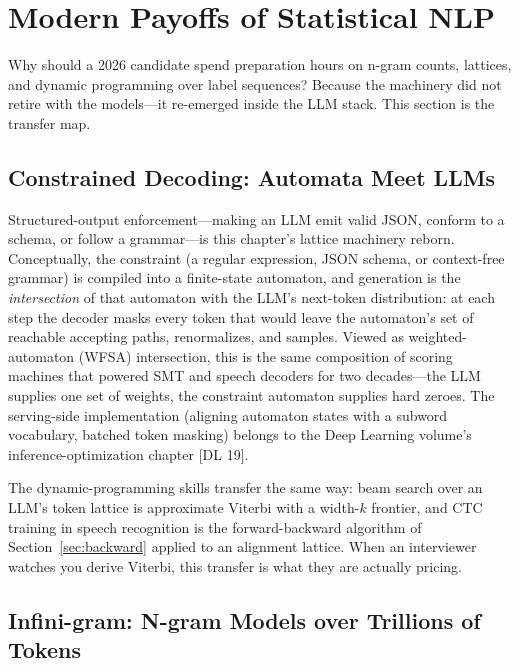 \section{Modern Payoffs of Statistical NLP}
\label{sec:modern_payoffs}

Why should a 2026 candidate spend preparation hours on n-gram counts, lattices,
and dynamic programming over label sequences?  Because the machinery did not
retire with the models---it re-emerged inside the LLM stack.  This section is
the transfer map.

\subsection{Constrained Decoding: Automata Meet LLMs}

Structured-output enforcement---making an LLM emit valid JSON, conform to a
schema, or follow a grammar---is this chapter's lattice machinery reborn.
Conceptually, the constraint (a regular expression, JSON schema, or
context-free grammar) is compiled into a finite-state automaton, and
generation is the \emph{intersection} of that automaton with the LLM's
next-token distribution: at each step the decoder masks every token that would
leave the automaton's set of reachable accepting paths, renormalizes, and
samples.  Viewed as weighted-automaton (WFSA) intersection, this is the same
composition of scoring machines that powered SMT and speech decoders for two
decades---the LLM supplies one set of weights, the constraint automaton
supplies hard zeroes.  The serving-side implementation (aligning automaton
states with a subword vocabulary, batched token masking) belongs to the Deep
Learning volume's inference-optimization chapter [DL 19].

The dynamic-programming skills transfer the same way: beam search over an
LLM's token lattice is approximate Viterbi with a width-$k$ frontier, and CTC
training in speech recognition is the forward-backward algorithm of
Section~\ref{sec:backward} applied to an alignment lattice.  When an
interviewer watches you derive Viterbi, this transfer is what they are
actually pricing.

\subsection{Infini-gram: N-gram Models over Trillions of Tokens}

